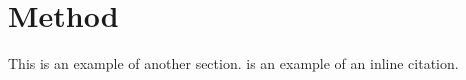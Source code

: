 \section{Method}
This is an example of another section. \textcite{kuljanin2018} is an example of an inline citation.